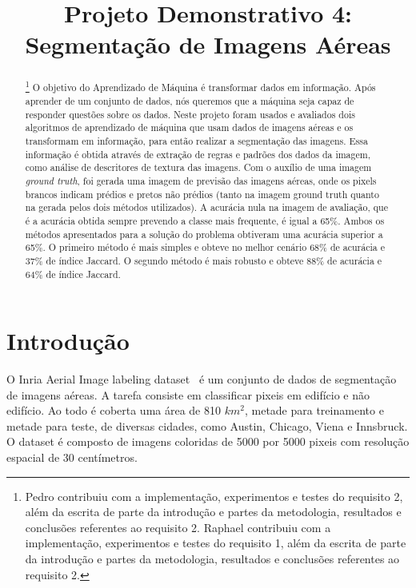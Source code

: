 \documentclass{bmvc2k}
\title{Projeto Demonstrativo 4: Segmentação de Imagens Aéreas}
\begin{document}
\begin{NoHyper}
\maketitle
\end{NoHyper}

\begin{abstract}
\footnote{Pedro contribuiu com a implementação, experimentos e testes do requisito 2, além da escrita de parte da introdução e partes da metodologia, resultados e conclusões referentes ao requisito 2. Raphael contribuiu com a implementação, experimentos e testes do requisito 1, além da escrita de parte da introdução e partes da metodologia, resultados e conclusões referentes ao requisito 2.} O objetivo do Aprendizado de Máquina é transformar dados em informação. Após aprender de um conjunto de dados, nós queremos que a máquina seja capaz de responder questões sobre os dados. Neste projeto foram usados e avaliados dois algoritmos de aprendizado de máquina que usam dados de imagens aéreas e os transformam em informação, para então realizar a segmentação das imagens. Essa informação é obtida através de extração de regras e padrões dos dados da imagem, como análise de descritores de textura das imagens. Com o auxílio de uma imagem \textit{ground truth}, foi gerada uma imagem de previsão das imagens aéreas, onde os pixels brancos indicam prédios e pretos não prédios (tanto na imagem ground truth quanto na gerada pelos dois métodos utilizados). A acurácia nula na imagem de avaliação, que é a acurácia obtida sempre prevendo a classe mais frequente, é igual a 65\%. Ambos os métodos apresentados para a solução do problema obtiveram uma acurácia superior a 65\%. O primeiro método é mais simples e obteve no melhor cenário 68\% de acurácia e 37\% de índice Jaccard. O segundo método é mais robusto e obteve 88\% de acurácia e 64\% de índice Jaccard. 
\end{abstract}

\section{Introdução}
\label{sec:intro}


O Inria Aerial Image labeling dataset~\cite{maggiori2017dataset} é um conjunto de dados de segmentação de imagens aéreas. A tarefa consiste em classificar pixeis em edifício e não edifício. Ao todo é coberta uma área de 810 $km^2$, metade para treinamento e metade para teste, de diversas cidades, como Austin, Chicago, Viena e Innsbruck. O dataset é composto de imagens coloridas de 5000 por 5000 pixeis com resolução espacial de 30 centímetros.
\end{document}
